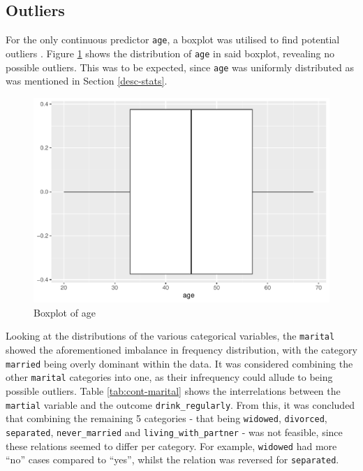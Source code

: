 \documentclass[
]{article}
\begin{document}
\hypertarget{outliers}{%
\subsection{Outliers}\label{outliers}}

For the only continuous predictor \texttt{age}, a boxplot was utilised to find potential outliers . Figure \ref{fig:age-outliers} shows the distribution of \texttt{age} in said boxplot, revealing no possible outliers. This was to be expected, since \texttt{age} was uniformly distributed as was mentioned in Section \ref{desc-stats}.

\begin{figure}
\centering
\includegraphics{report_files/figure-latex/age-outliers-1.pdf}
\caption{\label{fig:age-outliers}Boxplot of age}
\end{figure}

Looking at the distributions of the various categorical variables, the \texttt{marital} showed the aforementioned imbalance in frequency distribution, with the category \texttt{married} being overly dominant within the data. It was considered combining the other \texttt{marital} categories into one, as their infrequency could allude to being possible outliers. Table \ref{tab:cont-marital} shows the interrelations between the \texttt{martial} variable and the outcome \texttt{drink\_regularly}. From this, it was concluded that combining the remaining 5 categories - that being \texttt{widowed}, \texttt{divorced}, \texttt{separated}, \texttt{never\_married} and \texttt{living\_with\_partner} - was not feasible, since these relations seemed to differ per category. For example, \texttt{widowed} had more ``no'' cases compared to ``yes'', whilst the relation was reversed for \texttt{separated}.
\end{document}
